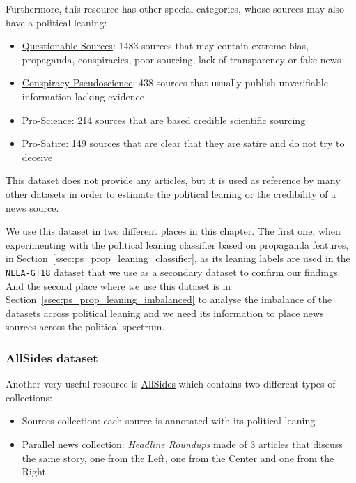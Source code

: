 Furthermore, this resource has other special categories, whose sources may also have a political leaning:

\begin{itemize}
    \item \href{https://mediabiasfactcheck.com/fake-news/}{Questionable Sources}: 1483 sources that may contain extreme bias, propaganda, conspiracies, poor sourcing, lack of transparency or fake news
    \item \href{https://mediabiasfactcheck.com/conspiracy/}{Conspiracy-Pseudoscience}: 438 sources that usually publish unverifiable information lacking evidence
    \item \href{https://mediabiasfactcheck.com/pro-science/}{Pro-Science}: 214 sources that are based credible scientific sourcing
    \item \href{https://mediabiasfactcheck.com/satire/}{Pro-Satire}: 149 sources that are clear that they are satire and do not try to deceive
\end{itemize}

This dataset does not provide any articles, but it is used as reference by many other datasets in order to estimate the political leaning or the credibility of a news source.

We use this dataset in two different places in this chapter.
The first one, when experimenting with the political leaning classifier based on propaganda features, in Section~\ref{ssec:ps_prop_leaning_classifier}, as its leaning labels are used in the \texttt{NELA-GT18} dataset that we use as a secondary dataset to confirm our findings.
And the second place where we use this dataset is in Section~\ref{ssec:ps_prop_leaning_imbalanced} to analyse the imbalance of the datasets across political leaning and we need its information to place news sources across the political spectrum.

\subsubsection{AllSides dataset}

Another very useful resource is \href{https://www.allsides.com/}{AllSides} which contains two different types of collections:

\begin{itemize}
    \item Sources collection: each source is annotated with its political leaning
    \item Parallel news collection: \emph{Headline Roundups\texttrademark} made of 3 articles that discuss the same story, one from the Left, one from the Center and one from the Right
\end{itemize}

